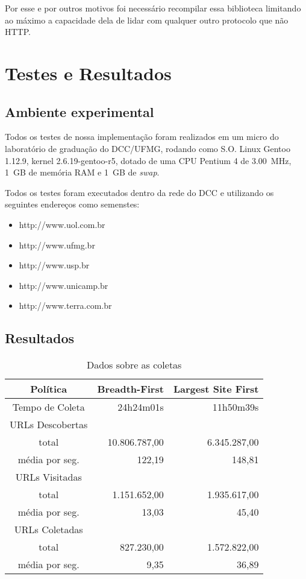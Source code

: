 \documentclass[10pt,twocolumn]{article}
\begin{document}
Por esse e por outros motivos foi necessário recompilar essa biblioteca
limitando ao máximo a capacidade dela de lidar com qualquer outro
protocolo que não HTTP.


\section{Testes e Resultados}

\subsection{Ambiente experimental}

Todos os testes de nossa implementação foram realizados em um micro do
laboratório de graduação do DCC/UFMG, rodando como S.O. Linux Gentoo
1.12.9, kernel 2.6.19-gentoo-r5, dotado de uma CPU Pentium 4 de
3.00~MHz, 1~GB de memória RAM e 1~GB de \emph{swap}.

Todos os testes foram executados dentro da rede do DCC e utilizando os
seguintes endereços como semenstes:
\begin{itemize}
\item http://www.uol.com.br
\item http://www.ufmg.br
\item http://www.usp.br
\item http://www.unicamp.br
\item http://www.terra.com.br
\end{itemize}

\subsection{Resultados}

\begin{table}[htbp]
\centering
\begin{tabular}{|c|r|r|} \hline
Política	&  Breadth-First	& Largest Site First	\\
\hline\hline
Tempo de Coleta &   24h24m01s		&	11h50m39s	\\\hline
URLs Descobertas& & \\
	total	& 	10.806.787,00	&	6.345.287,00	\\
média por seg.	&		122,19  &	      148,81	\\\hline
URLs Visitadas	& & \\
	total	& 	  1.151.652,00	&	1.935.617,00	\\
média por seg.	&		 13,03  &	       45,40	\\\hline
URLs Coletadas	& & \\
	total	& 	    827.230,00	&	1.572.822,00	\\
média por seg.	&		  9,35  & 	       36,89	\\\hline
\hline
\end{tabular}
\caption{Dados sobre as coletas}
\label{tab:sumario}
\end{table}
\end{document}
